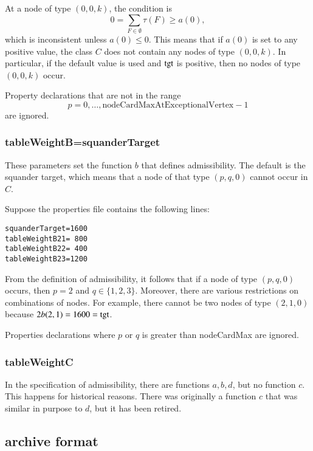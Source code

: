 \begin{example}
At a node of type $(0,0,k)$, the condition is
\[
0  =\sum_{F\in\emptyset}\tau(F) \ge a(0),
\]
which is inconsistent unless $a(0)\le 0$.  This means that if $a(0)$ is set to any
positive value, the class $C$ does not contain any nodes of type $(0,0,k)$.
In particular, if the default value is used and ${\operatorname{tgt}}$ is positive, then no nodes
of type $(0,0,k)$ occur.
\end{example}

Property declarations 
that are not in the range 
\[
p=0,\ldots,\text{nodeCardMaxAtExceptionalVertex}-1
\]
are ignored. 


\subsubsection{tableWeightB\wild\wild=squanderTarget}

These parameters set the function $b$ that defines admissibility.  The default is
the squander target, which means that a node of that type $(p,q,0)$ cannot occur in
$C$.

\begin{example} Suppose the properties file contains the following lines:
\begin{verbatim}
squanderTarget=1600
tableWeightB21= 800
tableWeightB22= 400
tableWeightB23=1200
\end{verbatim}
From the definition of admissibility, it follows that if a node of type $(p,q,0)$ occurs,
then $p=2$ and $q\in\{1,2,3\}$.  Moreover, there are various restrictions on 
combinations of nodes.  For example, there cannot be two nodes of type $(2,1,0)$ because
$2b(2,1)  = 1600={\operatorname{tgt}}$.
\end{example}
Properties declarations where $p$ or $q$ is greater than nodeCardMax are ignored.

\subsubsection{tableWeightC}

In the specification of admissibility, there are functions $a,b,d$,
but no function $c$.  This happens for historical reasons.  There was
originally a function $c$ that was similar in purpose to $d$, but it
has been retired.

\subsection{archive format}

